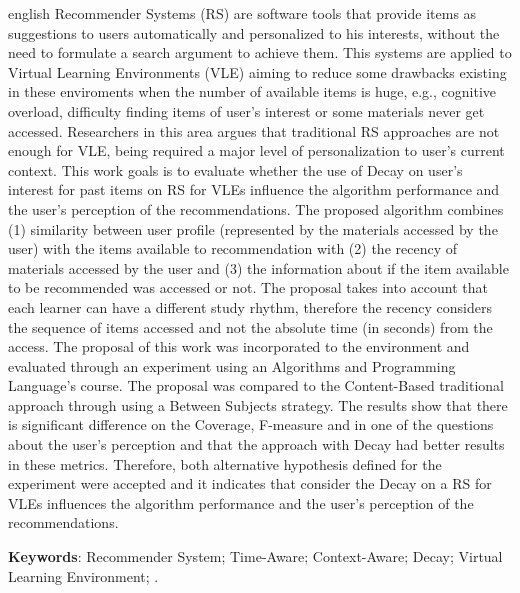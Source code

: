 \begin{resumo}[Abstract]
 \begin{otherlanguage*}{english}
  	Recommender Systems (RS) are software tools that provide items as suggestions to users automatically and personalized to his
    interests, without the need to formulate a search argument to achieve them. This systems are applied to Virtual Learning
    Environments (VLE) aiming to reduce some drawbacks existing in these enviroments when the number of available items is
    huge, e.g., cognitive overload, difficulty finding items of user's interest or some materials never get accessed. Researchers
    in this area argues that traditional RS approaches are not enough for VLE, being required a major level of personalization
    to user's current context. This work goals is to evaluate whether the use of Decay on user's interest for past items
    on RS for VLEs influence the algorithm performance and the user's perception of the recommendations. The proposed
    algorithm combines (1) similarity between user profile (represented by the materials accessed by the user) with the items
    available to recommendation with (2) the recency of materials accessed by the user and (3) the information about if
    the item available to be recommended was accessed or not. The proposal takes into account that each learner can have
    a different study rhythm, therefore the recency considers the sequence of items accessed and not the absolute time (in
    seconds) from the access. The proposal of this work was incorporated to the \adaptwebspace environment and evaluated
    through an experiment using an Algorithms and Programming Language's course. The proposal was compared to the Content-Based traditional approach
    through using a Between Subjects strategy. The results show that there is significant difference on the Coverage,
    F-measure and in one of the questions about the user's perception and that the approach with Decay had better results
    in these metrics. Therefore, both alternative hypothesis defined for the experiment were accepted and it indicates
    that consider the Decay on a RS for VLEs influences the algorithm performance and the user's perception of the recommendations.
    \vspace{\onelineskip}

    \noindent
    \textbf{Keywords}: Recommender System; Time-Aware; Context-Aware; Decay; Virtual Learning Environment; \adaptweb.
 \end{otherlanguage*}
\end{resumo}

\listoffigures*
\cleardoublepage

\listoftables*
\cleardoublepage
